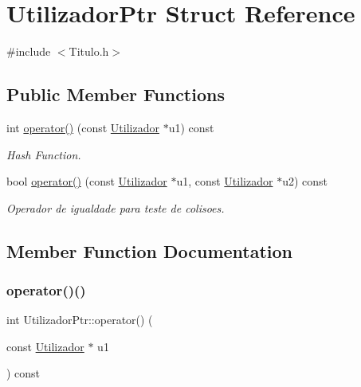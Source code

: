 \hypertarget{structUtilizadorPtr}{}\section{Utilizador\+Ptr Struct Reference}
\label{structUtilizadorPtr}


{\ttfamily \#include $<$Titulo.\+h$>$}

\subsection*{Public Member Functions}
\begin{DoxyCompactItemize}
\item 
int \hyperlink{structUtilizadorPtr_a51b14cea42ccf48388754bb5513f736f}{operator()} (const \hyperlink{classUtilizador}{Utilizador} $\ast$u1) const
\begin{DoxyCompactList}\small\item\em Hash Function. \end{DoxyCompactList}\item 
bool \hyperlink{structUtilizadorPtr_afdc486a21619e0451d59dd4a9f244866}{operator()} (const \hyperlink{classUtilizador}{Utilizador} $\ast$u1, const \hyperlink{classUtilizador}{Utilizador} $\ast$u2) const
\begin{DoxyCompactList}\small\item\em Operador de igualdade para teste de colisoes. \end{DoxyCompactList}\end{DoxyCompactItemize}


\subsection{Member Function Documentation}
\mbox{\label{structUtilizadorPtr_a51b14cea42ccf48388754bb5513f736f}} 
\subsubsection{\texorpdfstring{operator()()}{operator()()}\hspace{0.1cm}{\footnotesize\ttfamily [1/2]}}
{\footnotesize\ttfamily int Utilizador\+Ptr\+::operator() (\begin{DoxyParamCaption}\item[{const \hyperlink{classUtilizador}{Utilizador} $\ast$}]{u1 }\end{DoxyParamCaption}) const\hspace{0.3cm}{\ttfamily [inline]}}



